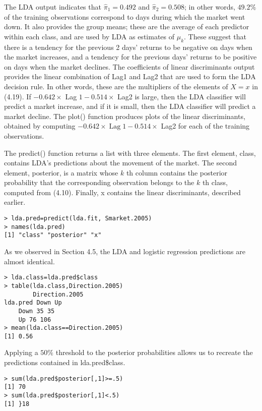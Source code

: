 \documentclass[10pt]{article}
\begin{document}
The LDA output indicates that $\hat{\pi}_{1}=0.492$ and $\hat{\pi}_{2}=0.508$; in other words, $49.2 \%$ of the training observations correspond to days during which the market went down. It also provides the group means; these are the average of each predictor within each class, and are used by LDA as estimates of $\mu_{k}$. These suggest that there is a tendency for the previous 2 days' returns to be negative on days when the market increases, and a tendency for the previous days' returns to be positive on days when the market declines. The coefficients of linear discriminants output provides the linear combination of Lag1 and Lag2 that are used to form the LDA decision rule. In other words, these are the multipliers of the elements of $X=x$ in (4.19). If $-0.642 \times$ Lag $1-0.514 \times$ Lag2 is large, then the LDA classifier will predict a market increase, and if it is small, then the LDA classifier will predict a market decline. The plot() function produces plots of the linear discriminants, obtained by computing $-0.642 \times \operatorname{Lag} 1-0.514 \times$ Lag2 for each of the training observations.

The predict() function returns a list with three elements. The first element, class, contains LDA's predictions about the movement of the market. The second element, posterior, is a matrix whose $k$ th column contains the posterior probability that the corresponding observation belongs to the $k$ th class, computed from (4.10). Finally, x contains the linear discriminants, described earlier.

\begin{verbatim}
> lda.pred=predict(lda.fit, Smarket.2005)
> names(lda.pred)
[1] "class" "posterior" "x"
\end{verbatim}

As we observed in Section 4.5, the LDA and logistic regression predictions are almost identical.

\begin{verbatim}
> lda.class=lda.pred$class
> table(lda.class,Direction.2005)
        Direction.2005
lda.pred Down Up
    Down 35 35
    Up 76 106
> mean(lda.class==Direction.2005)
[1] 0.56
\end{verbatim}

Applying a $50 \%$ threshold to the posterior probabilities allows us to recreate the predictions contained in lda.pred\$class.

\begin{verbatim}
> sum(lda.pred$posterior[,1]>=.5)
[1] 70
> sum(lda.pred$posterior[,1]<.5)
[1] }18
\end{verbatim}
\end{document}

